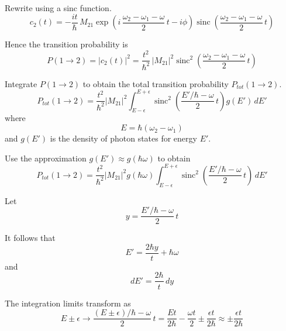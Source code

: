 Rewrite using a sinc function.
\begin{equation*}
c_2(t)=-\frac{it}{\hbar}\,M_{21}
\exp\left(i\,\frac{\omega_2-\omega_1-\omega}{2}\,t-i\phi\right)
\operatorname{sinc}\left(\frac{\omega_2-\omega_1-\omega}{2}\,t\right)
\tag{2}
\end{equation*}

Hence the transition probability is
\begin{equation*}
P(1\rightarrow2)=|c_2(t)|^2=\frac{t^2}{\hbar^2}\,|M_{21}|^2
\operatorname{sinc}^2\left(\frac{\omega_2-\omega_1-\omega}{2}\,t\right)
\tag{3}
\end{equation*}

Integrate $P(1\rightarrow2)$ to obtain the total transition probability
$P_{tot}(1\rightarrow2)$.
\begin{equation*}
P_{tot}(1\rightarrow2)=\frac{t^2}{\hbar^2}|M_{21}|^2
\int_{E-\epsilon}^{E+\epsilon}
\operatorname{sinc}^2\left(\frac{E'/\hbar-\omega}{2}\,t\right)
g(E')\,dE'
\end{equation*}
%
where
\begin{equation*}
E=\hbar(\omega_2-\omega_1)
\end{equation*}
%
and $g(E')$ is the density of photon states for energy $E'$.

\bigskip

Use the approximation $g(E')\approx g(\hbar\omega)$ to obtain
\begin{equation*}
P_{tot}(1\rightarrow2)=\frac{t^2}{\hbar^2}|M_{21}|^2g(\hbar\omega)
\int_{E-\epsilon}^{E+\epsilon}
\operatorname{sinc}^2\left(\frac{E'/\hbar-\omega}{2}\,t\right)\,dE'
\end{equation*}

Let
\begin{equation*}
y=\frac{E'/\hbar-\omega}{2}\,t
\end{equation*}

It follows that
\begin{equation*}
E'=\frac{2\hbar y}{t}+\hbar\omega
\end{equation*}
%
and
\begin{equation*}
dE'=\frac{2\hbar}{t}\,dy
\end{equation*}

The integration limits transform as
\begin{equation*}
E\pm\epsilon
\rightarrow
\frac{(E\pm\epsilon)/\hbar-\omega}{2}\,t
=\frac{Et}{2\hbar}-\frac{\omega t}{2}
\pm\frac{\epsilon t}{2\hbar}
\approx
\pm\frac{\epsilon t}{2\hbar}
\end{equation*}

